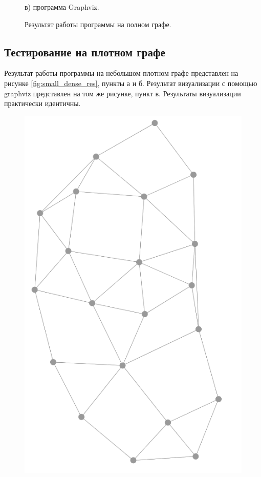 \documentclass[14pt, russian]{scrartcl}
\begin{document}
\begin{figure}[H]
\begin{minipage}[t]{.45\textwidth}
		\caption*{в) программа Graphviz.}
	\end{minipage}
	\caption{Результат работы программы на полном графе.}
	\label{fig:full_graph_res}
\end{figure}

\subsection{Тестирование на плотном графе}


Результат работы программы на небольшом плотном графе представлен на рисунке \ref{fig:small_dense_res}, пункты а и б. Результат визуализации с помощью graphviz представлен на том же рисунке, пункт в. Результаты визуализации практически идентичны.

\begin{figure}[H]
	\centering
	\begin{minipage}[t]{.35\textwidth}
		\centering
		\includegraphics[width=\linewidth]{./imgs/fg_small_dense.png}

\end{minipage}
\end{figure}
\end{document}
